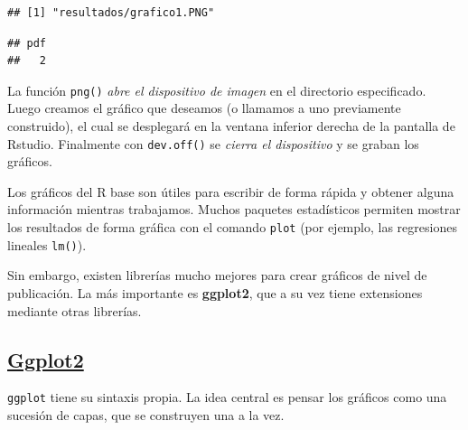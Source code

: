 \documentclass[]{book}
\newenvironment{Shaded}{\begin{snugshade}}{\end{snugshade}}
\newcommand{\DataTypeTok}[1]{\textcolor[rgb]{0.13,0.29,0.53}{#1}}
\newcommand{\KeywordTok}[1]{\textcolor[rgb]{0.13,0.29,0.53}{\textbf{#1}}}
\newcommand{\NormalTok}[1]{#1}
\newcommand{\OperatorTok}[1]{\textcolor[rgb]{0.81,0.36,0.00}{\textbf{#1}}}
\newcommand{\StringTok}[1]{\textcolor[rgb]{0.31,0.60,0.02}{#1}}
\begin{document}
\begin{verbatim}
## [1] "resultados/grafico1.PNG"
\end{verbatim}

\begin{Shaded}
\end{Shaded}

\begin{verbatim}
## pdf 
##   2
\end{verbatim}

La función \texttt{png()} \emph{abre el dispositivo de imagen} en el directorio especificado. Luego creamos el gráfico que deseamos (o llamamos a uno previamente construido), el cual se desplegará en la ventana inferior derecha de la pantalla de Rstudio. Finalmente con \texttt{dev.off()} se \emph{cierra el dispositivo} y se graban los gráficos.

Los gráficos del R base son útiles para escribir de forma rápida y obtener alguna información mientras trabajamos. Muchos paquetes estadísticos permiten mostrar los resultados de forma gráfica con el comando \texttt{plot} (por ejemplo, las regresiones lineales \texttt{lm()}).

Sin embargo, existen librerías mucho mejores para crear gráficos de nivel de publicación. La más importante es \textbf{ggplot2}, que a su vez tiene extensiones mediante otras librerías.

\hypertarget{ggplot2}{%
\subsection{\texorpdfstring{\href{http://ggplot2.tidyverse.org/reference/}{Ggplot2}}{Ggplot2}}\label{ggplot2}}

\texttt{ggplot} tiene su sintaxis propia. La idea central es pensar los gráficos como una sucesión de capas, que se construyen una a la vez.
\end{document}
